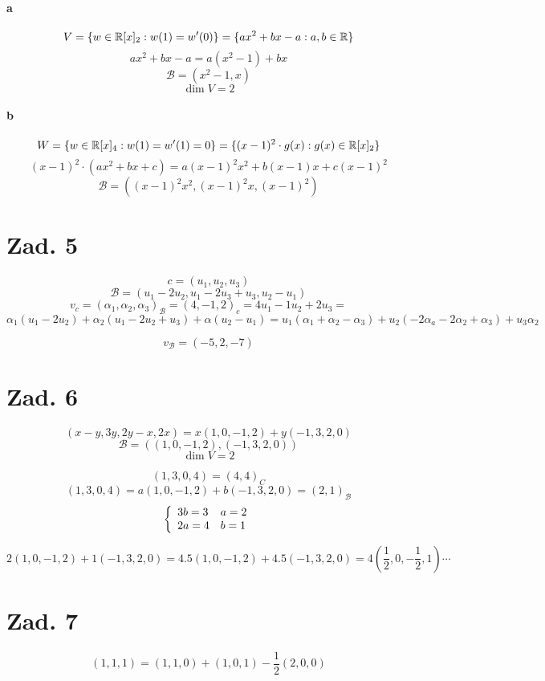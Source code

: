 \documentclass[a4paper,fleqn]{article}
\begin{document}
	\paragraph{a}
	\[ V = \{ w \in \mathbb{R}[x]_2 : w(1) = w'(0) \} = \{ ax^2+bx-a : a,b\in \mathbb{R} \} \]
	\[ ax^2 + bx - a = a(x^2-1)+bx \]
	\[ \mathcal{B} = (x^2-1,x) \]
	\[ \dim V = 2 \]

	\paragraph{b}
	\[ W = \{ w \in \mathbb{R}[x]_4 : w(1) = w'(1) = 0 \} =
		\{ (x-1)^2 \cdot g(x) : g(x)\in\mathbb{R}[x]_2 \} \]
	\[ (x-1)^2 \cdot (ax^2 + bx +c) = a(x-1)^2 x^2 + b(x-1)x + c(x-1)^2 \]
	\[ \mathcal{B} = \left( (x-1)^2 x^2, (x-1)^2x, (x-1)^2 \right) \]

	\section*{Zad. 5}
	\[ c = (u_1, u_2, u_3) \]
	\[ \mathcal{B} = (u_1 - 2u_2, u_1 - 2u_3 + u_3, u_2 - u_1) \]
	\[ v_c = (\alpha_1, \alpha_2, \alpha_3)_{\mathcal{B}} = (4,-1,2)_c =
		4u_1 - 1u_2 + 2u_3 = \]
	\[ \alpha_1(u_1-2u_2) + \alpha_2(u_1 - 2u_2 + u_3) +
		\alpha(u_2-u_1) = u_1(\alpha_1+\alpha_2-\alpha_3) +
		u_2(-2\alpha_a - 2\alpha_2 + \alpha_3) + u_3\alpha_2 \]
	\cdots

	\[ v_{\mathcal{B}} = (-5, 2, -7) \]

	\section*{Zad. 6}
	\[ (x-y, 3y, 2y-x, 2x) = x (1,0,-1,2) + y (-1,3,2,0) \]
	\[ \mathcal{B} = \left( (1,0,-1,2), (-1,3,2,0) \right) \]
	\[ \dim V = 2 \]

	\[ (1,3,0,4) = (4,4)_C \]
	\[ (1,3,0,4) = a(1,0,-1,2) + b(-1,3,2,0) = (2,1)_{\mathcal{B}} \]
	\[ \left\{ \begin{array}{l l} 3b = 3 & a = 2 \\ 2a = 4 & b = 1\end{array} \right. \]

	\[ 2(1,0,-1,2)+1(-1,3,2,0) = 4.5 (1,0,-1,2)+4.5 (-1,3,2,0) =
		4(\frac 1 2, 0, -\frac 1 2 , 1) \cdots \]

	\section*{Zad. 7}
	\[ (1,1,1) = (1,1,0) + (1,0,1) - \frac 1 2 (2,0,0) \]
\end{document}
